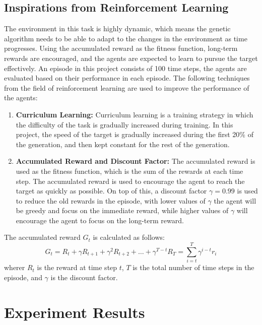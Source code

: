 \documentclass[sigconf]{acmart}
\begin{document}
\subsection{Inspirations from Reinforcement Learning}
The environment in this task is highly dynamic, which means the genetic algorithm needs to be able to adapt to the changes in the environment as time progresses. Using the accumulated reward as the fitness function, long-term rewards are encouraged, and the agents are expected to learn to pursue the target effectively.
An episode in this project consists of 100 time steps, the agents are evaluated based on their performance in each episode. The following techniques from the field of reinforcement learning are used to improve the performance of the agents:
\begin{enumerate}
  \item \textbf{Curriculum Learning:} Curriculum learning is a training strategy in which the difficulty of the task is gradually increased during training. In this project, the speed of the target is gradually increased during the first 20\% of the generation, and then kept constant for the rest of the generation.
  \item \textbf{Accumulated Reward and Discount Factor:} The accumulated reward is used as the fitness function, which is the sum of the rewards at each time step. The accumulated reward is used to encourage the agent to reach the target as quickly as possible. On top of this, a discount factor $\gamma = 0.99$ is used to reduce the old rewards in the episode, with lower values of $\gamma$ the agent will be greedy and focus on the immediate reward, while higher values of $\gamma$ will encourage the agent to focus on the long-term reward. 
\end{enumerate}
The accumulated reward $G_t$ is calculated as follows:
\begin{equation}
  G_t = R_t + \gamma R_{t+1} + \gamma^2 R_{t+2} + \ldots + \gamma^{T-t} R_T = \sum_{i=t}^{T} \gamma^{i-t} r_i
  \label{eq:discount}
\end{equation}
wherer $R_t$ is the reward at time step $t$, $T$ is the total number of time steps in the episode, and $\gamma$ is the discount factor.

\section{Experiment Results}
\end{document}
